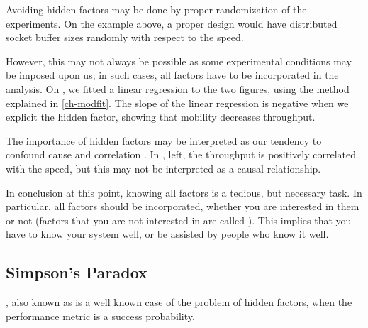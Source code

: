 Avoiding hidden factors may be done by proper randomization of
the experiments. On the example above, a proper design would
have distributed socket buffer sizes randomly with respect to
the speed.


However, this may not always be possible as some experimental
conditions may be imposed upon us; in such cases, all factors have
to be incorporated in the analysis. On , we
fitted a linear regression to the two figures, using the method
explained in \cref{ch-modfit}. The slope of the linear regression is
negative when we explicit the hidden factor, showing that mobility
decreases throughput.



The importance of hidden factors may be interpreted as our tendency
to confound cause and correlation \cite{pearl1988pri}. In
, left, the throughput is positively
correlated with the speed, but this may not be interpreted as a
causal relationship.


In conclusion at this point, knowing all factors is a tedious,
but necessary task. In particular, all factors should be
incorporated, whether you are interested in them or not
(factors that you are not interested in are called ). This implies that you have to know your system well,
or be assisted by people who know it well.
%
%
%
%

\subsection{Simpson's Paradox} , also known as
 is a well known case of the problem of hidden
factors, when the performance metric is a success probability.

